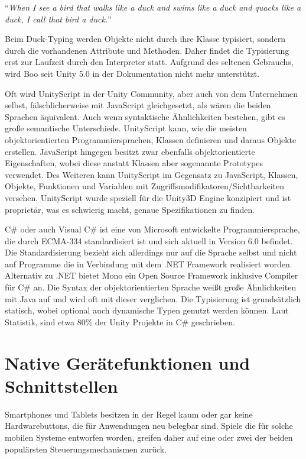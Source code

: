 \bigskip
“\emph{When I see a bird that walks like a duck and swims like a duck and quacks like a duck, I call that bird a duck.}” \citep{ducktest}

\bigskip
Beim Duck-Typing werden Objekte nicht durch ihre Klasse typisiert, sondern durch die vorhandenen Attribute und Methoden. Daher findet die Typisierung erst zur Laufzeit durch den Interpreter statt. Aufgrund des seltenen Gebrauchs, wird Boo seit Unity 5.0 in der Dokumentation nicht mehr unterstützt.

\bigskip
Oft wird UnityScript in der Unity Community, aber auch von dem Unternehmen selbst, fälschlicherweise mit JavaScript gleichgesetzt, als wären die beiden Sprachen äquivalent. Auch wenn syntaktische Ähnlichkeiten bestehen, gibt es große semantische Unterschiede.
UnityScript kann, wie die meisten objektorientierten Programmiersprachen, Klassen definieren und daraus Objekte erstellen. JavaScript hingegen besitzt zwar ebenfalls objektorientierte Eigenschaften, wobei diese anstatt Klassen aber sogenannte Prototypes verwendet. Des Weiteren kann UnityScript im Gegensatz zu JavaScript, Klassen, Objekte, Funktionen und Variablen mit Zugriffsmodifikatoren/Sichtbarkeiten versehen. UnityScript wurde speziell für die Unity3D Engine konzipiert und ist proprietär, was es schwierig macht, genaue Spezifikationen zu finden. \citep{unity_unityscript_vs_javascript}

\bigskip
C\# oder auch Visual C\# ist eine von Microsoft entwickelte Programmiersprache, die durch ECMA-334 standardisiert ist und sich aktuell in Version 6.0 befindet. Die Standardisierung bezieht sich allerdings nur auf die Sprache selbst und nicht auf Programme die in Verbindung mit dem .NET Framework realisiert worden. Alternativ zu .NET bietet Mono ein Open Source Framework inklusive Compiler für C\# an. Die Syntax der objektorientierten Sprache weißt große Ähnlichkeiten mit Java auf und wird oft mit dieser verglichen. Die Typisierung ist grundsätzlich statisch, wobei optional auch dynamische Typen genutzt werden können. \citep{csharp_in_depth}
Laut Statistik, sind etwa 80\% der Unity Projekte in C\# geschrieben. \citep{unity_languages}


\section{Native Gerätefunktionen und Schnittstellen}
Smartphones und Tablets besitzen in der Regel kaum oder gar keine Hardwarebuttons, die für Anwendungen neu belegbar sind. Spiele die für solche mobilen Systeme entworfen worden, greifen daher auf eine oder zwei der beiden populärsten Steuerungsmechanismen zurück.

